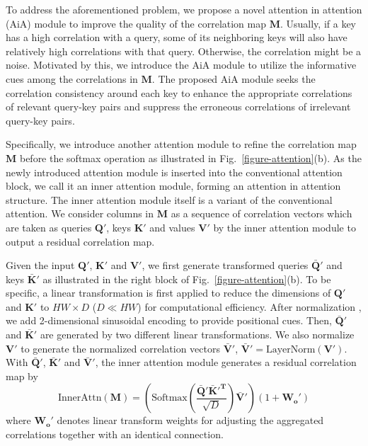 To address the aforementioned problem, we propose a novel attention in attention (AiA) module to improve the quality of the correlation map $\mathbf{M}$. Usually, if a key has a high correlation with a query, some of its neighboring keys will also have relatively high correlations with that query. Otherwise, the correlation might be a noise. Motivated by this, we introduce the AiA module to utilize the informative cues among the correlations in $\mathbf{M}$. The proposed AiA module seeks the correlation consistency around each key to enhance the appropriate correlations of relevant query-key pairs and suppress the erroneous correlations of irrelevant query-key pairs.

Specifically, we introduce another attention module to refine the correlation map $\mathbf{M}$ before the softmax operation as illustrated in Fig.~\ref{figure-attention}(b). As the newly introduced attention module is inserted into the conventional attention block, we call it an inner attention module, forming an attention in attention structure. The inner attention module itself is a variant of the conventional attention. We consider columns in $\mathbf{M}$ as a sequence of correlation vectors which are taken as queries $\mathbf{Q'}$, keys $\mathbf{K'}$ and values $\mathbf{V'}$ by the inner attention module to output a residual correlation map.

Given the input $\mathbf{Q'}$, $\mathbf{K'}$ and $\mathbf{V'}$, we first generate transformed queries $\mathbf{\bar{Q}'}$ and keys $\mathbf{\bar{K}'}$ as illustrated in the right block of Fig.~\ref{figure-attention}(b). To be specific, a linear transformation is first applied to reduce the dimensions of $\mathbf{Q'}$ and $\mathbf{K'}$ to $HW \times D$ ($D \ll HW$) for computational efficiency. After normalization \cite{ba2016layer}, we add 2-dimensional sinusoidal encoding \cite{dosovitskiy2020image,carion2020end} to provide positional cues. Then, $\mathbf{\bar{Q}'}$ and $\mathbf{\bar{K}'}$ are generated by two different linear transformations. We also normalize $\mathbf{V'}$ to generate the normalized correlation vectors $\mathbf{\bar{V}'}$, \ie $\mathbf{\bar{V}'} = \text{LayerNorm}(\mathbf{V'})$. With $\mathbf{\bar{Q}'}$, $\mathbf{\bar{K}'}$ and $\mathbf{\bar{V}'}$, the inner attention module generates a residual correlation map by
\begin{equation}
    \text{InnerAttn}(\mathbf{M}) = (\text{Softmax}\left(\frac{\mathbf{\bar{Q}'}\mathbf{\bar{K}'^{T}}}{\sqrt{D}}\right)\mathbf{\bar{V}'})(1 + \mathbf{W_{o}'})
\label{equation-aia}
\end{equation}
where $\mathbf{W_{o}'}$ denotes linear transform weights for adjusting the aggregated correlations together with an identical connection.

